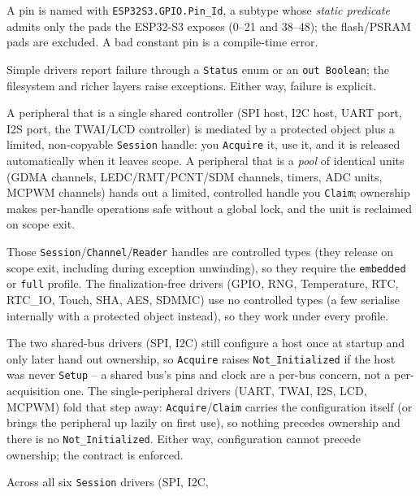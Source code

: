 \begin{description}[style=nextline]
\item[Valid-pin types.] A pin is named with \texttt{ESP32S3.GPIO.Pin\_Id}, a
  subtype whose \emph{static predicate} admits only the pads the ESP32-S3 exposes
  (0--21 and 38--48); the flash/PSRAM pads are excluded. A bad constant pin is a
  compile-time error.
\item[Errors.] Simple drivers report failure through a \texttt{Status} enum or an
  \texttt{out Boolean}; the filesystem and richer layers raise exceptions. Either
  way, failure is explicit.
\item[Task-safety, two shapes.] A peripheral that is a single shared controller
  (SPI host, I2C host, UART port, I2S port, the TWAI/LCD controller) is mediated
  by a protected object plus a limited, non-copyable \texttt{Session} handle: you
  \texttt{Acquire} it, use it, and it is released automatically when it leaves
  scope. A peripheral that is a \emph{pool} of identical units (GDMA channels,
  LEDC/RMT/PCNT/SDM channels, timers, ADC units, MCPWM channels) hands out a
  limited, controlled handle you \texttt{Claim}; ownership makes per-handle
  operations safe without a global lock, and the unit is reclaimed on scope exit.
\item[RAII.] Those \texttt{Session}/\texttt{Channel}/\texttt{Reader} handles are
  controlled types (they release on scope exit, including during exception
  unwinding), so they require the \texttt{embedded} or \texttt{full} profile.
  The finalization-free drivers (GPIO, RNG, Temperature, RTC, RTC\_IO, Touch, SHA,
  AES, SDMMC) use no controlled types (a few serialise internally with a protected
  object instead), so they work under every profile.
\item[Init-before-use guard.] The two shared-bus drivers (SPI, I2C) still
  configure a host once at startup and only later hand out ownership, so
  \texttt{Acquire} raises \texttt{Not\_Initialized} if the host was never
  \texttt{Setup} -- a shared bus's pins and clock are a per-bus concern, not a
  per-acquisition one. The single-peripheral drivers (UART, TWAI, I2S, LCD,
  MCPWM) fold that step away: \texttt{Acquire}/\texttt{Claim} carries the
  configuration itself (or brings the peripheral up lazily on first use), so
  nothing precedes ownership and there is no \texttt{Not\_Initialized}. Either
  way, configuration cannot precede ownership; the contract is enforced.
\item[Ownership gateway.] Across all six \texttt{Session} drivers (SPI, I2C,

\end{description}
